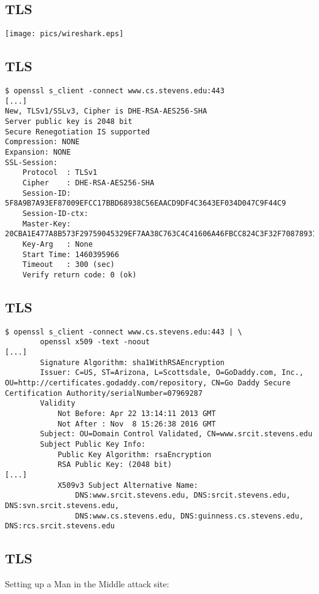 \documentclass[xga]{xdvislides}
\begin{document}
\subsection{TLS}
\begin{center}
	\texttt{[image: pics/wireshark.eps]}
\end{center}

\subsection{TLS}
\begin{verbatim}
$ openssl s_client -connect www.cs.stevens.edu:443
[...]
New, TLSv1/SSLv3, Cipher is DHE-RSA-AES256-SHA
Server public key is 2048 bit
Secure Renegotiation IS supported
Compression: NONE
Expansion: NONE
SSL-Session:
    Protocol  : TLSv1
    Cipher    : DHE-RSA-AES256-SHA
    Session-ID: 5F8A9B7A93EF87009EFCC17BBD68938C56EAACD9DF4C3643EF034D047C9F44C9
    Session-ID-ctx: 
    Master-Key: 20CBA1E477A8B573F29759045329EF7AA38C763C4C41606A46FBCC824C3F32F708789311E7B4275470E35CF09518FDCD
    Key-Arg   : None
    Start Time: 1460395966
    Timeout   : 300 (sec)
    Verify return code: 0 (ok)
\end{verbatim}

\subsection{TLS}
\begin{verbatim}
$ openssl s_client -connect www.cs.stevens.edu:443 | \
        openssl x509 -text -noout
[...]
        Signature Algorithm: sha1WithRSAEncryption
        Issuer: C=US, ST=Arizona, L=Scottsdale, O=GoDaddy.com, Inc., OU=http://certificates.godaddy.com/repository, CN=Go Daddy Secure Certification Authority/serialNumber=07969287
        Validity
            Not Before: Apr 22 13:14:11 2013 GMT
            Not After : Nov  8 15:26:38 2016 GMT
        Subject: OU=Domain Control Validated, CN=www.srcit.stevens.edu
        Subject Public Key Info:
            Public Key Algorithm: rsaEncryption
            RSA Public Key: (2048 bit)
[...]
            X509v3 Subject Alternative Name: 
                DNS:www.srcit.stevens.edu, DNS:srcit.stevens.edu, DNS:svn.srcit.stevens.edu,
                DNS:www.cs.stevens.edu, DNS:guinness.cs.stevens.edu, DNS:rcs.srcit.stevens.edu
\end{verbatim}

\subsection{TLS}
Setting up a Man in the Middle attack site: \\
\end{document}
